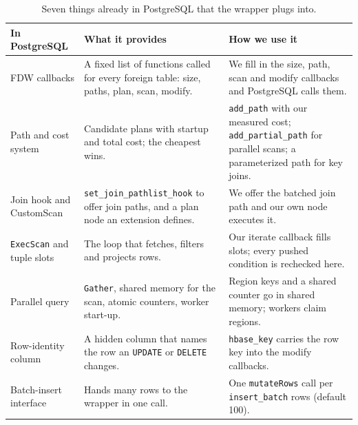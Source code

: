 \documentclass[11pt,a4paper]{article}
\newcommand{\code}[1]{\texttt{#1}}
\begin{document}
\begin{table}[htbp]
\centering\small
\caption{Seven things already in PostgreSQL that the wrapper plugs into.}
\label{tab:reused}
\begin{tabularx}{\textwidth}{@{}>{\raggedright\arraybackslash}p{}>{\raggedright\arraybackslash}X>{\raggedright\arraybackslash}X@{}}
\toprule
\textbf{In PostgreSQL} & \textbf{What it provides} & \textbf{How we use it}\\
\midrule
FDW callbacks & A fixed list of functions called for every foreign table: size, paths, plan, scan, modify. & We fill in the size, path, scan and modify callbacks and PostgreSQL calls them.\\
Path and cost system & Candidate plans with startup and total cost; the cheapest wins. & \code{add\_path} with our measured cost; \code{add\_partial\_path} for parallel scans; a parameterized path for key joins.\\
Join hook and CustomScan & \code{set\_join\_pathlist\_hook} to offer join paths, and a plan node an extension defines. & We offer the batched join path and our own node executes it.\\
\code{ExecScan} and tuple slots & The loop that fetches, filters and projects rows. & Our iterate callback fills slots; every pushed condition is rechecked here.\\
Parallel query & \code{Gather}, shared memory for the scan, atomic counters, worker start-up. & Region keys and a shared counter go in shared memory; workers claim regions.\\
Row-identity column & A hidden column that names the row an \code{UPDATE} or \code{DELETE} changes. & \code{hbase\_key} carries the row key into the modify callbacks.\\
Batch-insert interface & Hands many rows to the wrapper in one call. & One \code{mutateRows} call per \code{insert\_batch} rows (default 100).\\
\bottomrule
\end{tabularx}
\end{table}
\end{document}
